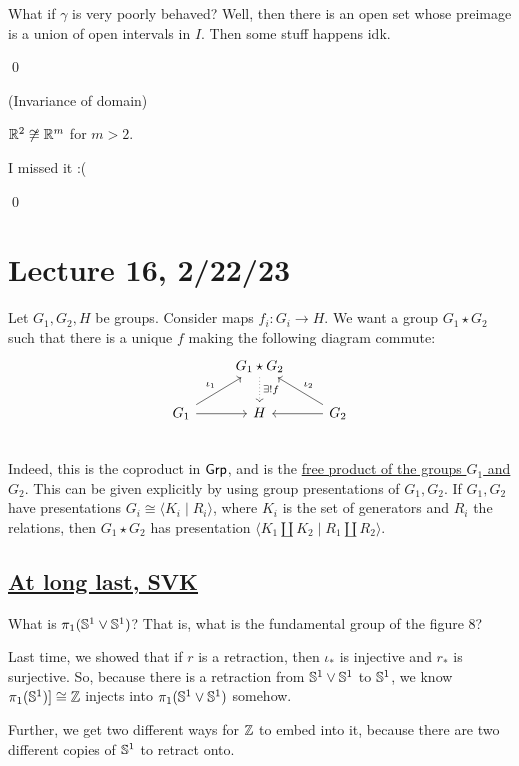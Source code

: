 \documentclass[x11names,reqno,14pt]{extarticle}
\begin{document}
What if $\gamma$ is very poorly behaved? Well, then there is an open set whose preimage is a union of open intervals in $I$. Then some stuff happens idk. 

\qed

\thm (Invariance of domain)

$\mathbb{R}^2 \not\cong \mathbb{R}^m$ for $m > 2$. 

\proof

I missed it :(

\qed

\section*{Lecture 16, 2/22/23}


Let $G_1, G_2, H$ be groups. Consider maps $f_i:G_i\to H$. We want a group $G_1\star G_2$ such that there is a unique $f$ making the following diagram commute:
\[
\begin{tikzcd}
& G_1\star G_2\ar[d, dotted, "\exists!f"] & \\
G_1\ar[ur, "\iota_1"] \ar[r] & H & \ar[l] G_2\ar[ul, "\iota_2"'] \\
\end{tikzcd}
\]
Indeed, this is the coproduct in ${{\text{\sffamily {Grp}}}}$, and is the \underline{free product of the groups $G_1$ and $G_2$}. This can be given explicitly by using group presentations of $G_1, G_2$. If $G_1, G_2$ have presentations $G_i \cong \langle K_i \mid R_i \rangle$, where $K_i$ is the set of generators and $R_i$ the relations, then $G_1\star G_2$ has presentation $\langle K_1 \coprod K_2 \mid R_1 \coprod R_2 \rangle$.

\subsection*{\underline{At long last, SVK}}

What is $\pi_1(\mathbb{S}^1\vee\mathbb{S}^1)$? That is, what is the fundamental group of the figure 8? 

Last time, we showed that if $r$ is a retraction, then $\iota_*$ is injective and $r_*$ is surjective. So, because there is a retraction from $\mathbb{S}^1\vee\mathbb{S}^1$ to $\mathbb{S}^1$, we know $\pi_1(\mathbb{S}^1) ]\cong \mathbb{Z}$ injects into $\pi_1(\mathbb{S}^1\vee\mathbb{S}^1)$ somehow. 

Further, we get two different ways for $\mathbb{Z}$ to embed into it, because there are two different copies of $\mathbb{S}^1$ to retract onto.
\end{document}
